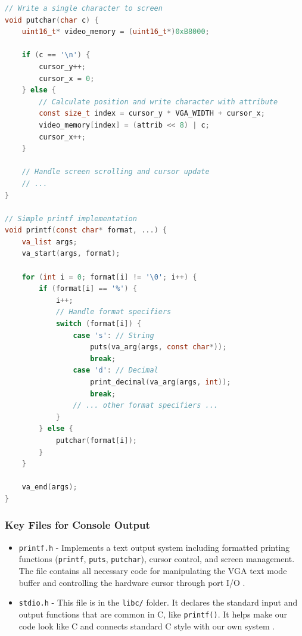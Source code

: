 \documentclass[a4paper,11pt]{article}
\begin{document}
\begin{lstlisting}[language=c]
// Write a single character to screen
void putchar(char c) {
    uint16_t* video_memory = (uint16_t*)0xB8000;
    
    if (c == '\n') {
        cursor_y++;
        cursor_x = 0;
    } else {
        // Calculate position and write character with attribute
        const size_t index = cursor_y * VGA_WIDTH + cursor_x;
        video_memory[index] = (attrib << 8) | c;
        cursor_x++;
    }
    
    // Handle screen scrolling and cursor update
    // ...
}

// Simple printf implementation
void printf(const char* format, ...) {
    va_list args;
    va_start(args, format);
    
    for (int i = 0; format[i] != '\0'; i++) {
        if (format[i] == '%') {
            i++;
            // Handle format specifiers
            switch (format[i]) {
                case 's': // String
                    puts(va_arg(args, const char*));
                    break;
                case 'd': // Decimal
                    print_decimal(va_arg(args, int));
                    break;
                // ... other format specifiers ...
            }
        } else {
            putchar(format[i]);
        }
    }
    
    va_end(args);
}
\end{lstlisting}

\subsubsection{Key Files for Console Output}
\begin{itemize}
    \item \texttt{printf.h} - Implements a text output system including formatted printing functions (\texttt{printf}, \texttt{puts}, \texttt{putchar}), cursor control, and screen management. The file contains all necessary code for manipulating the VGA text mode buffer and controlling the hardware cursor through port I/O \cite{VGA} \cite{PrintFIC}.
    
    \item \texttt{stdio.h} - This file is in the \texttt{libc/} folder. It declares the standard input and output functions that are common in C, like \texttt{printf()}. It helps make our code look like C and connects standard C style with our own system \cite{PrintFIC}.
    
\end{itemize}
\end{document}
